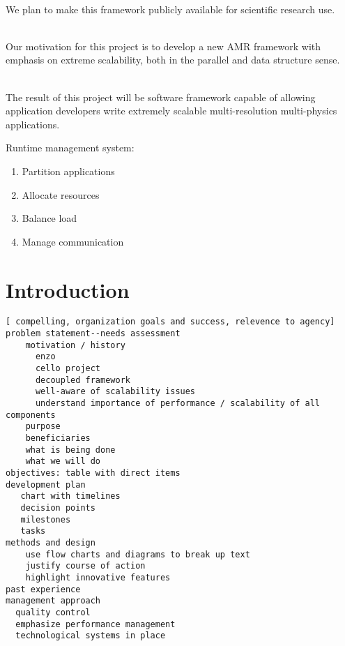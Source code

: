 \documentclass[14pt,letter]{article}
\begin{document}
\ \\ 
We plan to make this framework publicly available for scientific research use.

\ \\  
Our motivation for this project is to develop a new AMR framework with
emphasis on extreme scalability, both in the parallel and data structure
sense.

\ \\  
The result of this project will be software framework capable of
allowing application developers write extremely scalable
multi-resolution multi-physics applications.



Runtime management system:
\begin{enumerate}
\item Partition applications
\item Allocate resources
\item Balance load
\item Manage communication
\end{enumerate}

\section{Introduction} \label{s:intro}


\begin{verbatim}
[ compelling, organization goals and success, relevence to agency]
problem statement--needs assessment
    motivation / history
      enzo
      cello project
      decoupled framework
      well-aware of scalability issues
      understand importance of performance / scalability of all components
    purpose
    beneficiaries
    what is being done
    what we will do
objectives: table with direct items
development plan
   chart with timelines
   decision points
   milestones
   tasks
methods and design
    use flow charts and diagrams to break up text
    justify course of action
    highlight innovative features
past experience
management approach
  quality control
  emphasize performance management
  technological systems in place
\end{verbatim}
\end{document}
